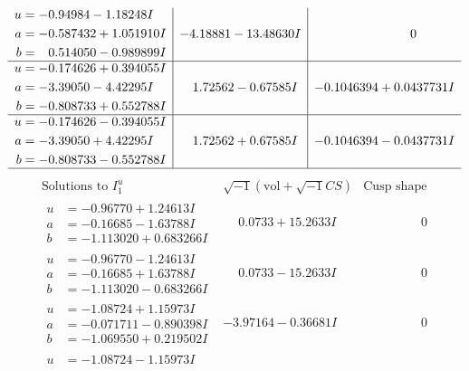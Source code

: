 \documentclass[1p]{elsarticle_modified}
\theoremstyle{definition}
\newcommand{\I}{\sqrt{-1}}
\begin{document}
$$\begin{array}{c|c|c}
\begin{aligned}
u &= -0.94984 - 1.18248 I \\
a &= -0.587432 + 1.051910 I \\
b &= \phantom{-}0.514050 - 0.989899 I\end{aligned}
 & -4.18881 - 13.48630 I & \phantom{-0.000000 } 0 \\ \hline\begin{aligned}
u &= -0.174626 + 0.394055 I \\
a &= -3.39050 - 4.42295 I \\
b &= -0.808733 + 0.552788 I\end{aligned}
 & \phantom{-}1.72562 - 0.67585 I & -0.1046394 + 0.0437731 I \\ \hline\begin{aligned}
u &= -0.174626 - 0.394055 I \\
a &= -3.39050 + 4.42295 I \\
b &= -0.808733 - 0.552788 I\end{aligned}
 & \phantom{-}1.72562 + 0.67585 I & -0.1046394 - 0.0437731 I\\
 \hline 
 \end{array}$$\newpage$$\begin{array}{c|c|c}  
\text{Solutions to }I^u_{1}& \I (\text{vol} + \sqrt{-1}CS) & \text{Cusp shape}\\
 \hline 
\begin{aligned}
u &= -0.96770 + 1.24613 I \\
a &= -0.16685 - 1.63788 I \\
b &= -1.113020 + 0.683266 I\end{aligned}
 & \phantom{-}0.0733 + 15.2633 I & \phantom{-0.000000 } 0 \\ \hline\begin{aligned}
u &= -0.96770 - 1.24613 I \\
a &= -0.16685 + 1.63788 I \\
b &= -1.113020 - 0.683266 I\end{aligned}
 & \phantom{-}0.0733 - 15.2633 I & \phantom{-0.000000 } 0 \\ \hline\begin{aligned}
u &= -1.08724 + 1.15973 I \\
a &= -0.071711 - 0.890398 I \\
b &= -1.069550 + 0.219502 I\end{aligned}
 & -3.97164 - 0.36681 I & \phantom{-0.000000 } 0 \\ \hline\begin{aligned}
u &= -1.08724 - 1.15973 I \\

\end{aligned}
\end{array}$$
\end{document}
